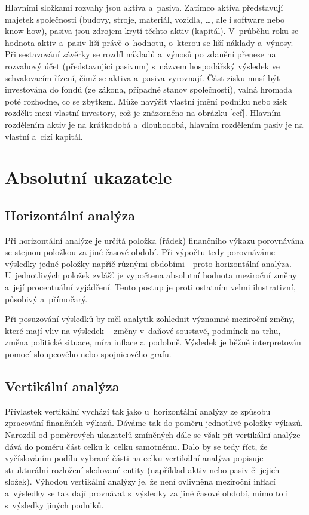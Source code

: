 Hlavními složkami rozvahy jsou aktiva a~pasiva. Zatímco aktiva představují majetek společnosti (budovy, stroje, materiál, vozidla, \dots, ale i software nebo know-how), pasiva jsou zdrojem krytí těchto aktiv (kapitál). V~průběhu roku se hodnota aktiv a~pasiv liší právě o~hodnotu, o~kterou se liší náklady a~výnosy. Při sestavování závěrky se rozdíl nákladů a~výnosů po zdanění přenese na rozvahový účet (představující pasivum) s~názvem hospodářský výsledek ve schvalovacím řízení, čímž se aktiva a~pasiva vyrovnají. Část zisku musí být investována do fondů (ze zákona, případně stanov společnosti), valná hromada poté rozhodne, co se zbytkem. Může navýšit vlastní jmění podniku nebo zisk rozdělit mezi vlastní investory, což je znázorněno na obrázku \ref{ccf}. Hlavním rozdělením aktiv je na krátkodobá a~dlouhodobá, hlavním rozdělením pasiv je na vlastní a~cizí kapitál.





\section{Absolutní ukazatele}

\subsection{Horizontální analýza}
Při horizontální analýze je určitá položka (řádek) finančního výkazu porovnávána se stejnou položkou za jiné časové období. Při výpočtu tedy porovnáváme výsledky jedné položky napříč různými obdobími - proto horizontální analýza. U~jednotlivých položek zvlášť je vypočtena absolutní hodnota meziroční změny a~její procentuální vyjádření. Tento postup je proti ostatním velmi ilustrativní, působivý a~přímočarý. 

Při posuzování výsledků by měl analytik zohlednit významné meziroční změny, které mají vliv na výsledek -- změny v~daňové soustavě, podmínek na trhu, změna politické situace, míra inflace a~podobně. Výsledek je běžně interpretován pomocí sloupcového nebo spojnicového grafu. 


\subsection{Vertikální analýza}
Přívlastek vertikální vychází tak jako u~horizontální analýzy ze způsobu zpracování finančních výkazů. Dáváme tak do poměru jednotlivé položky výkazů. Narozdíl od poměrových ukazatelů zmíněných dále se však při vertikální analýze dává do poměru část celku k~celku samotnému. Dalo by se tedy říct, že vyčíslováním podílu vybrané části na celku vertikální analýza popisuje strukturální rozložení sledované entity (například aktiv nebo pasiv či jejich složek). 
Výhodou vertikální analýzy je, že není ovlivněna meziroční inflací a~výsledky se tak dají provnávat s~výsledky za jiné časové období, mimo to i s~výsledky jiných podniků\cite{sedl}.






